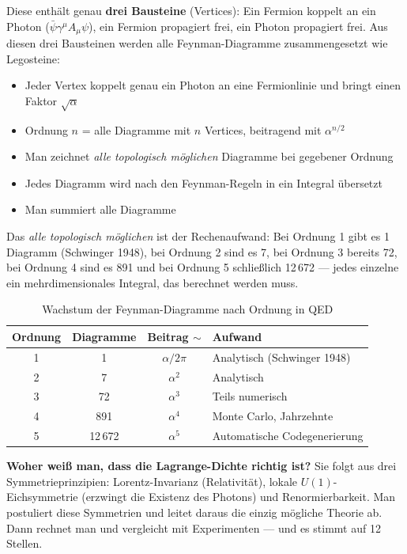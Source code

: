 Diese enthält genau \textbf{drei Bausteine} (Vertices): Ein Fermion koppelt an ein Photon ($\bar{\psi}\gamma^\mu A_\mu \psi$), ein Fermion propagiert frei, ein Photon propagiert frei. Aus diesen drei Bausteinen werden alle Feynman-Diagramme zusammengesetzt wie Legosteine:

\begin{itemize}
	\item Jeder Vertex koppelt genau ein Photon an eine Fermionlinie und bringt einen Faktor $\sqrt{\alpha}$
	\item Ordnung $n$ = alle Diagramme mit $n$ Vertices, beitragend mit $\alpha^{n/2}$
	\item Man zeichnet \textit{alle topologisch möglichen} Diagramme bei gegebener Ordnung
	\item Jedes Diagramm wird nach den Feynman-Regeln in ein Integral übersetzt
	\item Man summiert alle Diagramme
\end{itemize}

Das \textit{alle topologisch möglichen} ist der Rechenaufwand: Bei Ordnung 1 gibt es 1 Diagramm (Schwinger 1948), bei Ordnung 2 sind es 7, bei Ordnung 3 bereits 72, bei Ordnung 4 sind es 891 und bei Ordnung 5 schließlich 12\,672 — jedes einzelne ein mehrdimensionales Integral, das berechnet werden muss.

\begin{table}[h]
	\centering
	\begin{tabular}{cccl}
		\toprule
		\textbf{Ordnung} & \textbf{Diagramme} & \textbf{Beitrag} $\sim$ & \textbf{Aufwand} \\
		\midrule
		1 & 1        & $\alpha/2\pi$   & Analytisch (Schwinger 1948) \\
		2 & 7        & $\alpha^2$      & Analytisch \\
		3 & 72       & $\alpha^3$      & Teils numerisch \\
		4 & 891      & $\alpha^4$      & Monte Carlo, Jahrzehnte \\
		5 & 12\,672  & $\alpha^5$      & Automatische Codegenerierung \\
		\bottomrule
	\end{tabular}
	\caption{Wachstum der Feynman-Diagramme nach Ordnung in QED}
	\label{tab:diagrams}
\end{table}

\textbf{Woher weiß man, dass die Lagrange-Dichte richtig ist?} Sie folgt aus drei Symmetrieprinzipien: Lorentz-Invarianz (Relativität), lokale $U(1)$-Eichsymmetrie (erzwingt die Existenz des Photons) und Renormierbarkeit. Man postuliert diese Symmetrien und leitet daraus die einzig mögliche Theorie ab. Dann rechnet man und vergleicht mit Experimenten — und es stimmt auf 12 Stellen.

